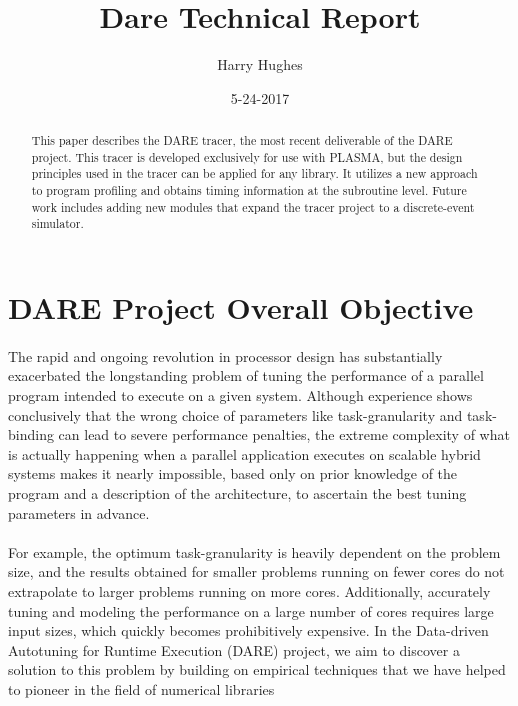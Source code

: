 \documentclass{article}
\begin{document}
\author{Harry Hughes}
\date{5-24-2017}
\title{Dare Technical Report}
\maketitle
\begin{abstract}
This paper describes the DARE tracer, the most recent deliverable of the DARE project. This tracer is developed exclusively for use with PLASMA, but the design principles used in the tracer can be applied for any library. It utilizes a new approach to program profiling and obtains timing information at the subroutine level. Future work includes adding new modules that expand the tracer project to a discrete-event simulator.

\end{abstract}

\section{DARE Project Overall Objective}
\paragraph{}
The rapid and ongoing revolution in processor design has substantially exacerbated the longstanding problem
of tuning the performance of a parallel program intended to execute on a given system. Although experience
shows conclusively that the wrong choice of parameters like task-granularity and task-binding can lead
to severe performance penalties, the extreme complexity of what is actually happening when a parallel
application executes on scalable hybrid systems makes it nearly impossible, based only on prior knowledge
of the program and a description of the architecture, to ascertain the best tuning parameters in advance. 
\paragraph{}
For
example, the optimum task-granularity is heavily dependent on the problem size, and the results obtained
for smaller problems running on fewer cores do not extrapolate to larger problems running on more cores.
Additionally, accurately tuning and modeling the performance on a large number of cores requires large input
sizes, which quickly becomes prohibitively expensive. In the Data-driven Autotuning for Runtime Execution
(DARE) project, we aim to discover a solution to this problem by building on empirical techniques that we
have helped to pioneer in the field of numerical libraries
\end{document}
